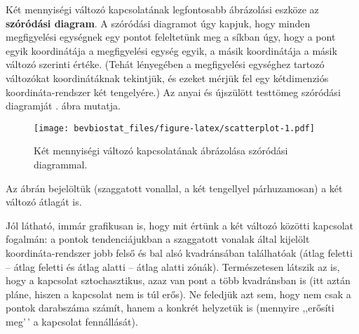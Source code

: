 \documentclass[
]{book}
\newenvironment{Shaded}{\begin{snugshade}}{\end{snugshade}}
\newcommand{\AttributeTok}[1]{\textcolor[rgb]{0.77,0.63,0.00}{#1}}
\newcommand{\FunctionTok}[1]{\textcolor[rgb]{0.00,0.00,0.00}{#1}}
\newcommand{\NormalTok}[1]{#1}
\newcommand{\SpecialCharTok}[1]{\textcolor[rgb]{0.00,0.00,0.00}{#1}}
\newcommand{\StringTok}[1]{\textcolor[rgb]{0.31,0.60,0.02}{#1}}
\begin{document}
Két mennyiségi változó kapcsolatának legfontosabb ábrázolási eszköze az \textbf{szóródási diagram}. A szóródási diagramot úgy kapjuk, hogy minden megfigyelési egységnek egy pontot feleltetünk meg a síkban úgy, hogy a pont egyik koordinátája a megfigyelési egység egyik, a másik koordinátája a másik változó szerinti értéke. (Tehát lényegében a megfigyelési egységhez tartozó változókat koordinátáknak tekintjük, és ezeket mérjük fel egy kétdimenziós koordináta-rendszer két tengelyére.) Az anyai és újszülött testtömeg szóródási diagramját . ábra mutatja.

\begin{Shaded}
\end{Shaded}

\begin{figure}
\centering
\texttt{[image: bevbiostat\_files/figure-latex/scatterplot-1.pdf]}
\caption{\label{fig:scatterplot}Két mennyiségi változó kapcsolatának ábrázolása szóródási diagrammal.}
\end{figure}

Az ábrán bejelöltük (szaggatott vonallal, a két tengellyel párhuzamosan) a két változó átlagát is.

Jól látható, immár grafikusan is, hogy mit értünk a két változó közötti kapcsolat fogalmán: a pontok tendenciájukban a szaggatott vonalak által kijelölt koordináta-rendszer jobb felső és bal alsó kvadránsában találhatóak (átlag feletti -- átlag feletti és átlag alatti -- átlag alatti zónák). Természetesen látszik az is, hogy a kapcsolat sztochasztikus, azaz van pont a több kvadránsban is (itt aztán pláne, hiszen a kapcsolat nem is túl erős). Ne feledjük azt sem, hogy nem csak a pontok darabszáma számít, hanem a konkrét helyzetük is (mennyire ,,erősíti meg'\,' a kapcsolat fennállását).
\end{document}
